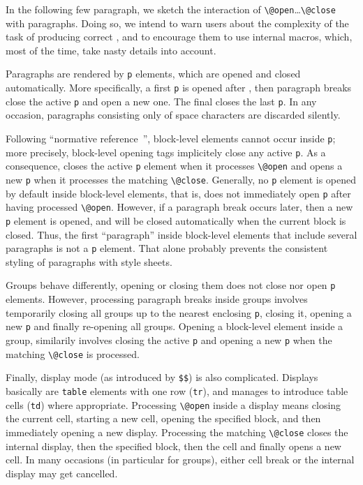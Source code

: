 In the following few paragraph, we sketch the interaction of
\verb+\@open+\ldots\verb+\@close+ with paragraphs.
Doing so, we intend to warn users about the complexity
of the task of producing correct \html{}, and to encourage
them to use internal macros, which, most of the time, take nasty
details into account.

Paragraphs are rendered by \verb+p+ elements, which are opened and
closed automatically.
More specifically, a first \verb+p+ is opened after
\verb++, then paragraph breaks close the active
\verb+p+ and open a new one.
The final \verb++ closes the last \verb+p+.
In any occasion, paragraphs consisting only of space characters
are discarded silently.

Following \html{} ``normative reference~\cite{html}'', block-level
elements cannot occur inside \verb+p+; more precisely,
block-level opening tags implicitely close any active \verb+p+.
As a consequence,
\hevea{} closes the active \verb+p+ element when it processes
\verb+\@open+
and opens a new \verb+p+ when it processes the matching
\verb+\@close+.
Generally, no \verb+p+ element is opened by default inside block-level
elements, that is, \hevea{} does not immediately open \verb+p+ after having
processed \verb+\@open+.
However, if a paragraph break occurs later, then a new \verb+p+
element is opened, and will be closed automatically
when the current block is closed.
Thus, the first ``paragraph'' inside block-level elements
that include several paragraphs is not a \verb+p+ element.
That alone probably prevents the consistent styling
of paragraphs with style sheets.

Groups behave differently, opening or closing them does
not close nor open \verb+p+ elements.
However, processing paragraph breaks inside groups involves temporarily
closing all groups up to the nearest enclosing \verb+p+, closing it,
opening a new \verb+p+ and finally re-opening all groups.
Opening a block-level element inside a group, similarily
involves closing the active \verb+p+ and opening a new \verb+p+
when the matching \verb+\@close+ is processed.

Finally, display mode (as introduced by \verb+$$+) is also
complicated. Displays basically are \verb+table+ elements with one row
(\verb+tr+), and \hevea{} manages to introduce table cells (\verb+td+)
where appropriate.  Processing \verb+\@open+ inside a display
means closing the current cell, starting a new cell, opening the
specified block, and then immediately opening a new display.
Processing the matching \verb+\@close+ closes the internal
display, then the specified block, then the cell and finally opens a
new cell. In many occasions (in particular for groups), either cell
break or the internal display may get cancelled.


